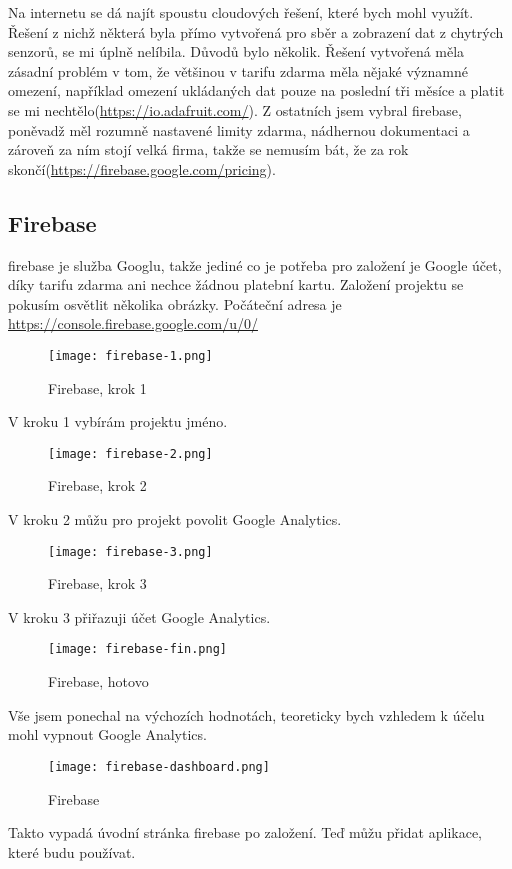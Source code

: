 Na internetu se dá najít spoustu cloudových řešení, které bych mohl využít. Řešení z nichž některá byla přímo vytvořená 
pro sběr a zobrazení dat z chytrých senzorů, se mi úplně nelíbila. Důvodů bylo několik. Řešení vytvořená  
měla zásadní problém v tom, že většinou v tarifu zdarma měla nějaké významné omezení, například omezení ukládaných dat 
pouze na poslední tři měsíce a platit se mi nechtělo(\url{https://io.adafruit.com/}). Z ostatních jsem vybral 
\gls{firebase}, poněvadž měl rozumně nastavené limity zdarma, nádhernou dokumentaci a zároveň za ním stojí velká firma, 
takže se nemusím bát, že za rok skončí(\url{https://firebase.google.com/pricing}).

\subsection{Firebase}
\gls{firebase} je služba Googlu, takže jediné co je potřeba pro založení je Google účet, díky tarifu zdarma ani nechce 
žádnou platební kartu. Založení projektu se pokusím osvětlit několika obrázky. Počáteční adresa je 
\url{https://console.firebase.google.com/u/0/}

\begin{figure}[H]
    \centering
    \texttt{[image: firebase-1.png]}
    \caption{Firebase, krok 1}
\end{figure}
V kroku 1 vybírám projektu jméno.
\begin{figure}[H]
    \centering
    \texttt{[image: firebase-2.png]}
    \caption{Firebase, krok 2}
\end{figure}
V kroku 2 můžu pro projekt povolit Google Analytics.
\begin{figure}[H]
    \centering
    \texttt{[image: firebase-3.png]}
    \caption{Firebase, krok 3}
\end{figure}
V kroku 3 přiřazuji účet Google Analytics.%
\begin{figure}[H]
    \centering
    \texttt{[image: firebase-fin.png]}
    \caption{Firebase, hotovo}
\end{figure}
Vše jsem ponechal na výchozích hodnotách, teoreticky bych vzhledem k účelu mohl vypnout Google Analytics.
\begin{figure}[H]
    \centering
    \texttt{[image: firebase-dashboard.png]}
    \caption{Firebase}
\end{figure}
Takto vypadá úvodní stránka \gls{firebase} po založení. Teď můžu přidat aplikace, které budu používat.


